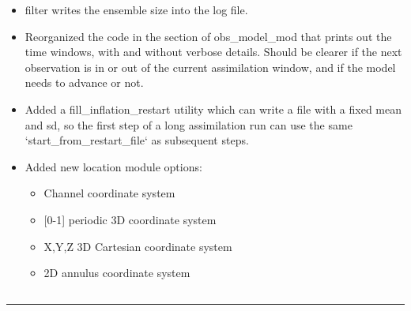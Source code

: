 \documentclass[letterpaper,10pt,english]{sphinxmanual}
\begin{document}
\begin{itemize}
\item {} 
filter writes the ensemble size into the log file.

\item {} 
Reorganized the code in the section of obs\_model\_mod that prints
out the time windows, with and without verbose details. Should be
clearer if the next observation is in or out of the current
assimilation window, and if the model needs to advance or not.

\item {} 
Added a fill\_inflation\_restart utility which can write a file with
a fixed mean and sd, so the first step of a long assimilation run
can use the same `start\_from\_restart\_file` as subsequent steps.

\item {} 
Added new location module options:
\begin{itemize}
\item {} 
Channel coordinate system

\item {} 
{[}0-1{]} periodic 3D coordinate system

\item {} 
X,Y,Z 3D Cartesian coordinate system

\item {} 
2D annulus coordinate system

\end{itemize}

\end{itemize}


\subsection{\textbar{}}
\label{docs/Lanai_diffs_from_Kodiak:id1}

\bigskip\hrule{}\bigskip
\end{document}
